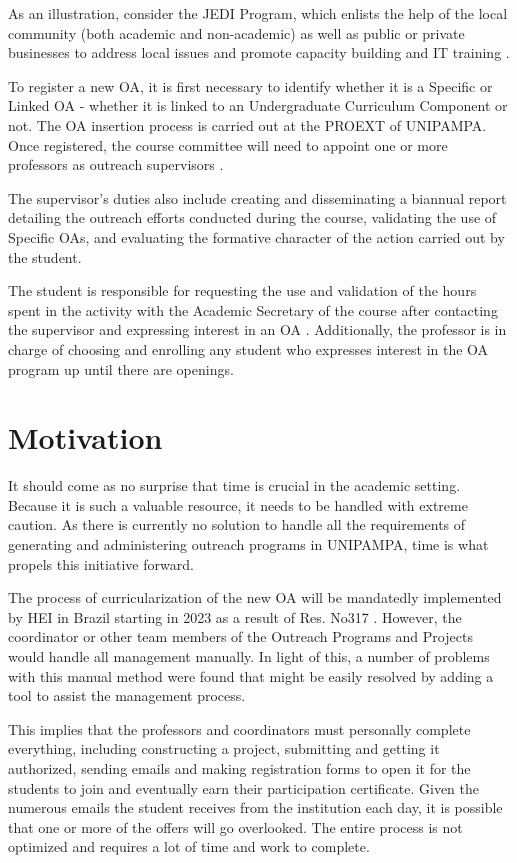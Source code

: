 As an illustration, consider the JEDI Program, which enlists the help of the local community (both academic and non-academic) as well as public or private businesses to address local issues and promote capacity building and IT training \cite{chamadaJedi}.

To register a new \ac{OA}, it is first necessary to identify whether it is a Specific or Linked \ac{OA} - whether it is linked to an Undergraduate Curriculum Component or not. The \ac{OA} insertion process is carried out at the \ac{PROEXT} of \ac{UNIPAMPA}. Once registered, the course committee will need to appoint one or more professors as outreach supervisors \cite{res317}.

The supervisor's duties also include creating and disseminating a biannual report detailing the outreach efforts conducted during the course, validating the use of Specific \acp{OA}, and evaluating the formative character of the action carried out by the student.

The student is responsible for requesting the use and validation of the hours spent in the activity with the Academic Secretary of the course after contacting the supervisor and expressing interest in an \ac{OA} \cite{res317}. Additionally, the professor is in charge of choosing and enrolling any student who expresses interest in the \ac{OA} program up until there are openings.

\section{Motivation}\label{sec:motivation}

It should come as no surprise that time is crucial in the academic setting. Because it is such a valuable resource, it needs to be handled with extreme caution. As there is currently no solution to handle all the requirements of generating and administering outreach programs in \ac{UNIPAMPA}, time is what propels this initiative forward.

The process of curricularization of the new \ac{OA} will be mandatedly implemented by \ac{HEI} in Brazil starting in 2023 as a result of Res. No317 \cite{res317}. However, the coordinator or other team members of the Outreach Programs and Projects would handle all management manually. In light of this, a number of problems with this manual method were found that might be easily resolved by adding a tool to assist the management process.

This implies that the professors and coordinators must personally complete everything, including constructing a project, submitting and getting it authorized, sending emails and making registration forms to open it for the students to join and eventually earn their participation certificate. Given the numerous emails the student receives from the institution each day, it is possible that one or more of the offers will go overlooked. The entire process is not optimized and requires a lot of time and work to complete.

